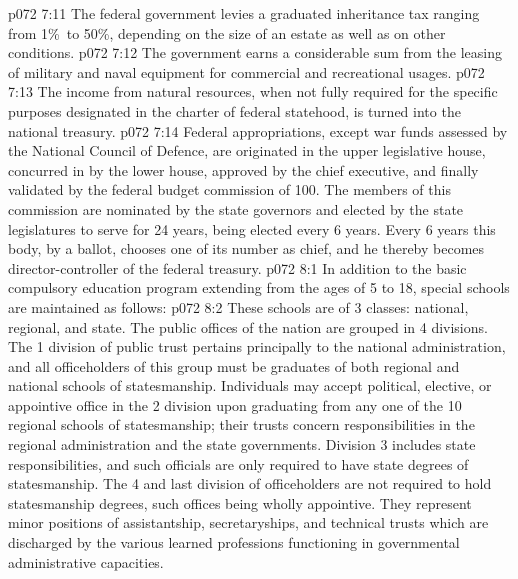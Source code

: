 \vs p072 7:11 \bibnobreakspace {} The federal government levies a graduated inheritance tax ranging from 1\%\ to 50\%, depending on the size of an estate as well as on other conditions.
\vs p072 7:12 \bibnobreakspace {} The government earns a considerable sum from the leasing of military and naval equipment for commercial and recreational usages.
\vs p072 7:13 \bibnobreakspace {} The income from natural resources, when not fully required for the specific purposes designated in the charter of federal statehood, is turned into the national treasury.
\vs p072 7:14 \pc Federal appropriations, except war funds assessed by the National Council of Defence, are originated in the upper legislative house, concurred in by the lower house, approved by the chief executive, and finally validated by the federal budget commission of 100. The members of this commission are nominated by the state governors and elected by the state legislatures to serve for 24 years,  being elected every 6 years. Every 6 years this body, by a  ballot, chooses one of its number as chief, and he thereby becomes director\hyp{}controller of the federal treasury.
\vs p072 8:1 In addition to the basic compulsory education program extending from the ages of 5 to 18, special schools are maintained as follows:
\vs p072 8:2 \bibnobreakspace {} These schools are of 3 classes: national, regional, and state. The public offices of the nation are grouped in 4 divisions. The 1 division of public trust pertains principally to the national administration, and all officeholders of this group must be graduates of both regional and national schools of statesmanship. Individuals may accept political, elective, or appointive office in the 2 division upon graduating from any one of the 10 regional schools of statesmanship; their trusts concern responsibilities in the regional administration and the state governments. Division 3 includes state responsibilities, and such officials are only required to have state degrees of statesmanship. The 4 and last division of officeholders are not required to hold statesmanship degrees, such offices being wholly appointive. They represent minor positions of assistantship, secretaryships, and technical trusts which are discharged by the various learned professions functioning in governmental administrative capacities.
